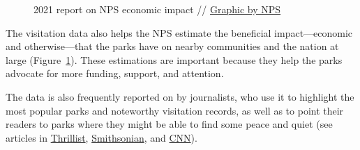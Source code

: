 \documentclass[
  letterpaper,
  DIV=11,
  numbers=noendperiod]{scrartcl}
\begin{document}
\begin{figure}


\caption{\label{fig-economic-benefit}2021 report on NPS economic impact
// \href{https://www.nps.gov/orgs/1207/vse2020.htm}{Graphic by NPS}}

\end{figure}%

The visitation data also helps the NPS estimate the beneficial
impact---economic and otherwise---that the parks have on nearby
communities and the nation at large (Figure~\ref{fig-economic-benefit}).
These estimations are important because they help the parks advocate for
more funding, support, and attention.

The data is also frequently reported on by journalists, who use it to
highlight the most popular parks and noteworthy visitation records, as
well as to point their readers to parks where they might be able to find
some peace and quiet (see articles in
\href{https://www.thrillist.com/news/nation/most-visited-national-parks-ranked-nps}{Thrillist},
\href{https://www.smithsonianmag.com/smart-news/most-and-least-popular-national-parks-2023-180983850/}{Smithsonian},
and
\href{https://www.cnn.com/travel/article/most-visited-us-national-park-sites-2022/index.html}{CNN}).
\end{document}
